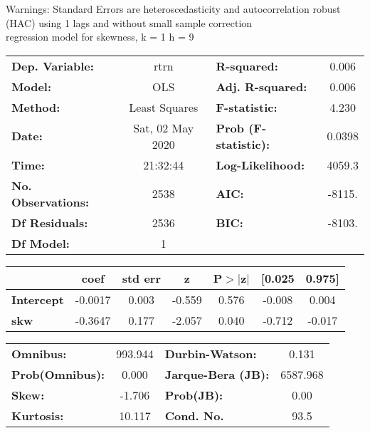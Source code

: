 Warnings: \newline
 [1] Standard Errors are heteroscedasticity and autocorrelation robust (HAC) using 1 lags and without small sample correction\\ 

regression model for skewness, k = 1 h = 9\begin{center}
\begin{tabular}{lclc}
\toprule
\textbf{Dep. Variable:}    &       rtrn       & \textbf{  R-squared:         } &     0.006   \\
\textbf{Model:}            &       OLS        & \textbf{  Adj. R-squared:    } &     0.006   \\
\textbf{Method:}           &  Least Squares   & \textbf{  F-statistic:       } &     4.230   \\
\textbf{Date:}             & Sat, 02 May 2020 & \textbf{  Prob (F-statistic):} &   0.0398    \\
\textbf{Time:}             &     21:32:44     & \textbf{  Log-Likelihood:    } &    4059.3   \\
\textbf{No. Observations:} &        2538      & \textbf{  AIC:               } &    -8115.   \\
\textbf{Df Residuals:}     &        2536      & \textbf{  BIC:               } &    -8103.   \\
\textbf{Df Model:}         &           1      & \textbf{                     } &             \\
\bottomrule
\end{tabular}
\begin{tabular}{lcccccc}
                   & \textbf{coef} & \textbf{std err} & \textbf{z} & \textbf{P$> |$z$|$} & \textbf{[0.025} & \textbf{0.975]}  \\
\midrule
\textbf{Intercept} &      -0.0017  &        0.003     &    -0.559  &         0.576        &       -0.008    &        0.004     \\
\textbf{skw}       &      -0.3647  &        0.177     &    -2.057  &         0.040        &       -0.712    &       -0.017     \\
\bottomrule
\end{tabular}
\begin{tabular}{lclc}
\textbf{Omnibus:}       & 993.944 & \textbf{  Durbin-Watson:     } &    0.131  \\
\textbf{Prob(Omnibus):} &   0.000 & \textbf{  Jarque-Bera (JB):  } & 6587.968  \\
\textbf{Skew:}          &  -1.706 & \textbf{  Prob(JB):          } &     0.00  \\
\textbf{Kurtosis:}      &  10.117 & \textbf{  Cond. No.          } &     93.5  \\
\bottomrule
\end{tabular}
\end{center}

